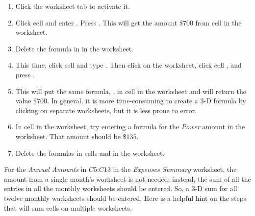 \begin{enumbox}
	\begin{enumerate}
		\item Click the  worksheet tab to activate it.
		\item Click cell  and enter . Press . This will get the amount $ \$700 $ from cell  in the  worksheet.
		\item Delete the formula in  in the  worksheet.
		\item This time, click cell  and type \fmtTyping{=}. Then click on the  worksheet, click cell , and press .
		\item This will put the same formula, , in cell  in the  worksheet and will return the value $ \$700 $. In general, it is more time-consuming to create a $ 3 $-D formula by clicking on separate worksheets, but it is less prone to error.
		\item In cell  in the  worksheet, try entering a formula for the \textit{Power} amount in the  worksheet. That amount should be $ \$135 $.
		\item Delete the formulas in cells  and  in the  worksheet.
	\end{enumerate}
\end{enumbox}

For the \textit{Annual Amounts} in $ C5 $:$ C13 $ in the \textit{Expenses Summary} worksheet, the amount from a single month's worksheet is not needed; instead, the sum of all the entries in all the monthly worksheets should be entered. So, a $ 3 $-D sum for all twelve monthly worksheets should be entered. Here is a helpful hint on the steps that will sum cells on multiple worksheets.

